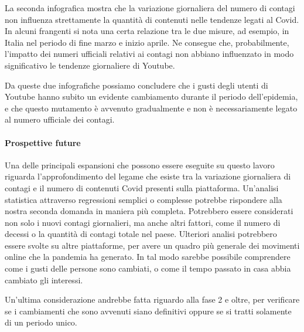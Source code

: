 \documentclass[10pt, a4paper,openany]{article}
\begin{document}
La seconda infografica mostra che la variazione giornaliera del numero di contagi non influenza strettamente la quantità di contenuti nelle tendenze legati al Covid. In alcuni frangenti si nota una certa relazione tra le due misure, ad esempio, in Italia nel periodo di fine marzo e inizio aprile. Ne consegue che, probabilmente, l'impatto dei numeri ufficiali relativi ai contagi non abbiano influenzato in modo significativo le tendenze giornaliere di Youtube.

Da queste due infografiche possiamo concludere che i gusti degli utenti di Youtube hanno subito un evidente cambiamento durante il periodo dell'epidemia, e che questo mutamento è avvenuto gradualmente e non è necessariamente legato al numero ufficiale dei contagi.

\paragraph{Prospettive future\\}

Una delle principali espansioni che possono essere eseguite su questo lavoro riguarda l'approfondimento del legame che esiste tra la variazione giornaliera di contagi e il numero di contenuti Covid presenti sulla piattaforma. Un'analisi statistica attraverso regressioni semplici o complesse potrebbe rispondere alla nostra seconda domanda in maniera più completa. Potrebbero essere considerati non solo i nuovi contagi giornalieri, ma anche altri fattori, come il numero di decessi o la quantità di contagi totale nel paese.
Ulteriori analisi potrebbero essere svolte su altre piattaforme, per avere un quadro più generale dei movimenti online che la pandemia ha generato. In tal modo sarebbe possibile comprendere come i gusti delle persone sono cambiati, o come il tempo passato in casa abbia cambiato gli interessi.

Un'ultima considerazione andrebbe fatta riguardo alla fase 2 e oltre, per verificare se i cambiamenti che sono avvenuti siano definitivi oppure se si tratti solamente di un periodo unico.
\end{document}
